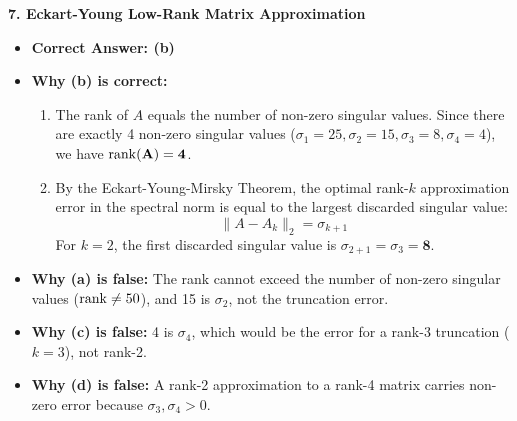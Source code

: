 \textbf{7. Eckart-Young Low-Rank Matrix Approximation}
\begin{itemize}
    \item \textbf{Correct Answer: (b)}
    \item \textbf{Why (b) is correct:}
    \begin{enumerate}
        \item The rank of $A$ equals the number of non-zero singular values. Since there are exactly 4 non-zero singular values ($\sigma_1=25, \sigma_2=15, \sigma_3=8, \sigma_4=4$), we have $\mathbf{\operatorname{rank}(A) = 4}$.
        \item By the Eckart-Young-Mirsky Theorem, the optimal rank-$k$ approximation error in the spectral norm is equal to the largest discarded singular value:
        \begin{equation*}
        \|A - A_k\|_2 = \sigma_{k+1}
        \end{equation*}
        For $k = 2$, the first discarded singular value is $\sigma_{2+1} = \sigma_3 = \mathbf{8}$.
    \end{enumerate}
    \item \textbf{Why (a) is false:} The rank cannot exceed the number of non-zero singular values ($\operatorname{rank} \neq 50$), and 15 is $\sigma_2$, not the truncation error.
    \item \textbf{Why (c) is false:} 4 is $\sigma_4$, which would be the error for a rank-3 truncation ($k=3$), not rank-2.
    \item \textbf{Why (d) is false:} A rank-2 approximation to a rank-4 matrix carries non-zero error because $\sigma_3, \sigma_4 > 0$.
\end{itemize}





